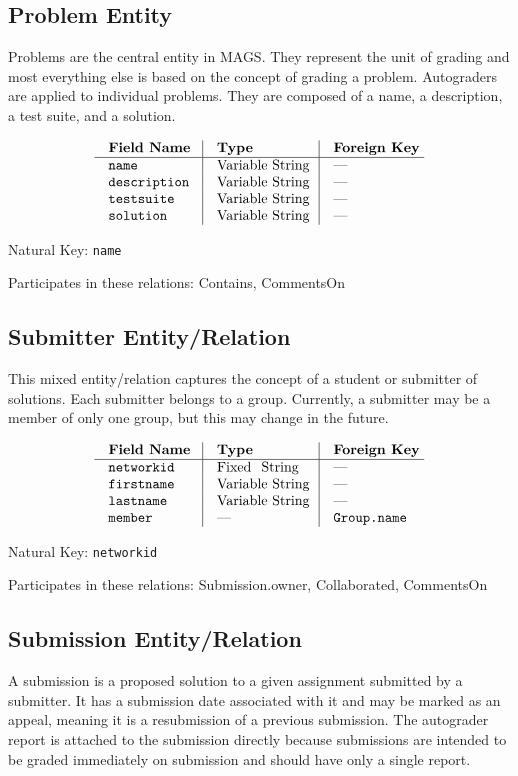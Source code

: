\subsection{Problem Entity}
Problems are the central entity in MAGS. 
They represent the unit of grading and most everything else is based on 
the concept of grading a problem.
Autograders are applied to individual problems. 
They are composed of a name, a description, a test suite, and a solution.

$$\vbox{
  \offinterlineskip
  \halign{
    \strut \quad {\tt #}  & \vrule\quad #  & \vrule\quad # \cr
    {\bf Field Name}  & {\bf Type}  & {\bf Foreign Key}\cr
    \noalign{\hrule}    
    name  & Variable String  & --- \cr
    description  & Variable String  & --- \cr
    testsuite  & Variable String  & --- \cr
    solution  & Variable String & --- \cr
  }
}$$

{\noindent
Natural Key: {\tt name}\par\noindent
Participates in these relations: Contains, CommentsOn\par}

\subsection{Submitter Entity/Relation}
This mixed entity/relation captures the concept
of a student or submitter of solutions.
Each submitter belongs to a group.
Currently, a submitter may be a member of only one group,
but this may change in the future.

$$\vbox{
  \offinterlineskip
  \halign{
    \strut \quad {\tt #}  & \vrule\quad #  & \vrule\quad # \cr
    {\bf Field Name}  & {\bf Type}  & {\bf Foreign Key}\cr
    \noalign{\hrule}    
    networkid  & Fixed String  & --- \cr
    firstname  & Variable String  & --- \cr
    lastname  & Variable String  & --- \cr
    member  & ---  & {\tt Group.name} \cr
  }
}$$

{\noindent
Natural Key: {\tt networkid}\par\noindent
Participates in these relations: Submission.owner, Collaborated, CommentsOn \par}

\subsection{Submission Entity/Relation}
A submission is a proposed solution to a given assignment
submitted by a submitter. It has a submission date associated with 
it and may be marked as an appeal, meaning it is a resubmission
of a previous submission.
The autograder report is attached to the submission directly 
because submissions are intended to be graded immediately on submission
and should have only a single report.

